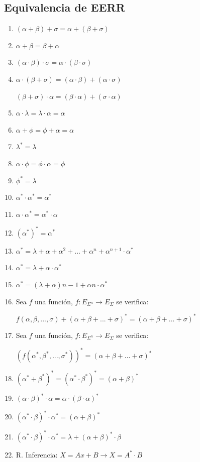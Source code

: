 \documentclass[12pt, twoside, openright]{report} %
\begin{document}
\subsection{Equivalencia de EERR}
\begin{multicols}{2}
\begin{enumerate}
  \item $(\alpha+\beta)+\sigma = \alpha + (\beta + \sigma)$
  \item $\alpha + \beta = \beta + \alpha$
  \item $(\alpha \cdot \beta)\cdot\sigma = \alpha \cdot (\beta\cdot\sigma)$
  \item $\alpha \cdot (\beta +\sigma) = (\alpha \cdot \beta) + (\alpha \cdot \sigma)$
  
  $(\beta +\sigma) \cdot \alpha  = (\beta \cdot \alpha) + (\sigma \cdot \alpha)$
  \item $\alpha \cdot \lambda = \lambda \cdot \alpha = \alpha$
  \item $\alpha + \phi = \phi + \alpha = \alpha$
  \item $\lambda^* = \lambda$
  \item $\alpha \cdot \phi = \phi \cdot \alpha= \phi$
  \item $\phi^* = \lambda$
  \item $\alpha^* \cdot \alpha^* = \alpha^*$
  \item $\alpha \cdot \alpha^* = \alpha^* \cdot \alpha$
  \columnbreak
  \item $(\alpha^*)^*=\alpha^*$
  \item $\alpha^* = \lambda + \alpha + \alpha^2 + ... + \alpha^n + \alpha^{n+1} \cdot \alpha^*$
  \item $\alpha^* = \lambda + \alpha \cdot \alpha^*$
  \item $\alpha^* = (\lambda + \alpha)n-1 + \alpha n \cdot \alpha^*$
  \item Sea $f$ una función, $f: E_{\Sigma^n} \rightarrow E_\Sigma$ se verifica: 
  
  $f(\alpha, \beta, ..., \sigma) + (\alpha + \beta + ... + \sigma)^* = (\alpha + \beta + ... + \sigma)^*$

  \item Sea $f$ una función, $f: E_{\Sigma^n} \rightarrow E_\Sigma$ se verifica: 
  
  $(f(\alpha^*, \beta^*, ..., \sigma^*))^* = (\alpha + \beta + ... + \sigma)^*$

  \item $(\alpha^* + \beta^*)^* = (\alpha^* \cdot \beta^*)^* = (\alpha + \beta)^*$
  \item $(\alpha \cdot \beta)^*\cdot \alpha = \alpha \cdot (\beta \cdot \alpha)^*$
  \item $(\alpha^* \cdot \beta)^*\cdot \alpha^* =(\alpha + \beta)^*$  
  \item $(\alpha^* \cdot \beta)^*\cdot \alpha^* = \lambda + (\alpha + \beta)^*\cdot \beta$
  \item R. Inferencia: $X=Ax + B \rightarrow X = A^* \cdot B$
\end{enumerate}
\end{multicols}
\end{document}
